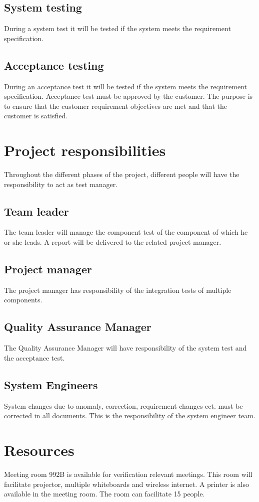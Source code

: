 \subsection{System testing}
During a system test it will be tested if the system meets the requirement specification. 

\subsection{Acceptance testing}
During an acceptance test it will be tested if the system meets the requirement specification. Acceptance test must be approved by the customer. The purpose is to ensure that the customer requirement objectives are met and that the customer is satisfied.

\label{sec_projectresponsibilities}
\section{Project responsibilities}
Throughout the different phases of the project, different people will have the responsibility to act as test manager.


\subsection{Team leader}
The team leader will manage the component test of the component of which he or she leads. A report will be delivered to the related project manager.

\subsection{Project manager}
The project manager has responsibility of the integration tests of multiple components.

\subsection{Quality Assurance Manager}
The Quality Assurance Manager will have responsibility of the system test and the acceptance test. 

\subsection{System Engineers}
System changes due to anomaly, correction, requirement changes ect. must be corrected in all documents. This is the responsibility of the system engineer team.


\section{Resources}
Meeting room 992B is available for verification relevant meetings. This room will facilitate projector, multiple whiteboards and wireless internet. A printer is also available in the meeting room. The room can facilitate 15 people.
 



